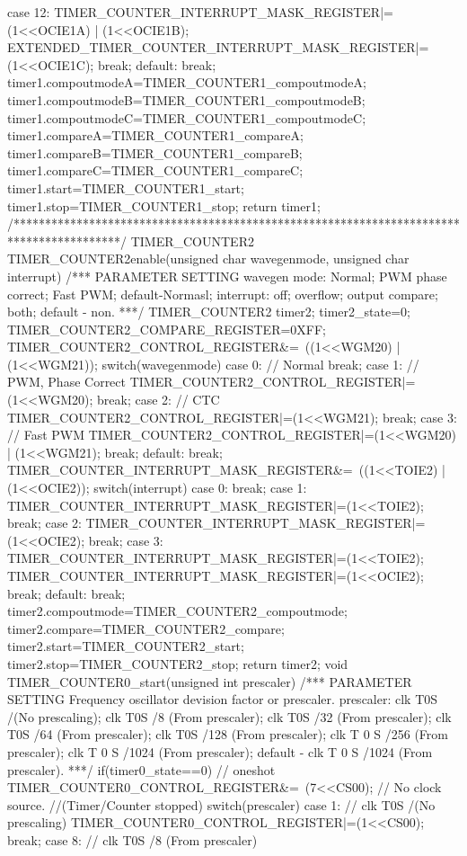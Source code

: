 \begin{verbatimtab}
{{		case 12:
		TIMER_COUNTER_INTERRUPT_MASK_REGISTER|=(1<<OCIE1A) | (1<<OCIE1B);
		EXTENDED_TIMER_COUNTER_INTERRUPT_MASK_REGISTER|=(1<<OCIE1C);
		break;
		default:
		break;
	}
	timer1.compoutmodeA=TIMER_COUNTER1_compoutmodeA;
	timer1.compoutmodeB=TIMER_COUNTER1_compoutmodeB;
	timer1.compoutmodeC=TIMER_COUNTER1_compoutmodeC;
	timer1.compareA=TIMER_COUNTER1_compareA;
	timer1.compareB=TIMER_COUNTER1_compareB;
	timer1.compareC=TIMER_COUNTER1_compareC;
	timer1.start=TIMER_COUNTER1_start;
	timer1.stop=TIMER_COUNTER1_stop;
	return timer1;
}
/*****************************************************************************************/
TIMER_COUNTER2 TIMER_COUNTER2enable(unsigned char wavegenmode, unsigned char interrupt)
/***
PARAMETER SETTING
wavegen mode: Normal; PWM phase correct; Fast PWM; default-Normasl;
interrupt: off; overflow; output compare; both; default - non.
***/
{
	TIMER_COUNTER2 timer2;
	timer2_state=0;
	TIMER_COUNTER2_COMPARE_REGISTER=0XFF;
	TIMER_COUNTER2_CONTROL_REGISTER&=~((1<<WGM20) | (1<<WGM21));
	switch(wavegenmode){
		case 0: // Normal
		break;
		case 1: // PWM, Phase Correct
		TIMER_COUNTER2_CONTROL_REGISTER|=(1<<WGM20);
		break;
		case 2: // CTC
		TIMER_COUNTER2_CONTROL_REGISTER|=(1<<WGM21);
		break;
		case 3: // Fast PWM
		TIMER_COUNTER2_CONTROL_REGISTER|=(1<<WGM20) | (1<<WGM21);
		break;
		default:
		break;
	}
	TIMER_COUNTER_INTERRUPT_MASK_REGISTER&=~((1<<TOIE2) | (1<<OCIE2));
	switch(interrupt){
		case 0: 
		break;
		case 1:
		TIMER_COUNTER_INTERRUPT_MASK_REGISTER|=(1<<TOIE2);
		break;
		case 2:
		TIMER_COUNTER_INTERRUPT_MASK_REGISTER|=(1<<OCIE2);
		break;
		case 3:
		TIMER_COUNTER_INTERRUPT_MASK_REGISTER|=(1<<TOIE2);
		TIMER_COUNTER_INTERRUPT_MASK_REGISTER|=(1<<OCIE2);
		break;
		default:
		break;
	}
	timer2.compoutmode=TIMER_COUNTER2_compoutmode;
	timer2.compare=TIMER_COUNTER2_compare;
	timer2.start=TIMER_COUNTER2_start;
	timer2.stop=TIMER_COUNTER2_stop;
	return timer2;
}
void TIMER_COUNTER0_start(unsigned int prescaler)
/***
PARAMETER SETTING
Frequency oscillator devision factor or prescaler.
prescaler: clk T0S /(No prescaling);
clk T0S /8 (From prescaler); clk T0S /32 (From prescaler);
clk T0S /64 (From prescaler); clk T0S /128 (From prescaler);
clk T 0 S /256 (From prescaler);
clk T 0 S /1024 (From prescaler); default - clk T 0 S /1024 (From prescaler).
***/
{
	if(timer0_state==0){ // oneshot
		TIMER_COUNTER0_CONTROL_REGISTER&=~(7<<CS00); // No clock source.
		//(Timer/Counter stopped)
		switch(prescaler){
			case 1: // clk T0S /(No prescaling)
			TIMER_COUNTER0_CONTROL_REGISTER|=(1<<CS00);
			break;
			case 8: // clk T0S /8 (From prescaler)
}}}
\end{verbatimtab}
